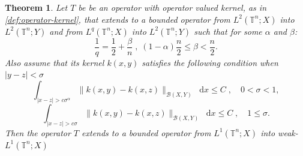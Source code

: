 \documentclass[12pt, reqno]{amsart}
\newtheorem{theorem}{Theorem}[section]
\theoremstyle{definition}
\theoremstyle{remark}
\numberwithin{equation}{section}
\newcommand*\diff{\mathop{}\!\mathrm{d}}
\begin{document}
\begin{theorem}
    Let $T$ be be an operator with operator valued kernel, as in \cref{def:operator-kernel},  that extends to a bounded operator from $L^2(\mathbb{T}^n; X)$ into $L^2(\mathbb{T}^n; Y)$ and from $L^q(\mathbb{T}^n; X)$ into $L^2(\mathbb{T}^n; Y)$ such that for some $\alpha$ and $\beta$:
    \begin{equation}
        \frac{1}{q} = \frac{1}{2} + \frac{\beta}{n} \; , \; (1-\alpha)\frac{n}{2} \leq \beta < \frac{n}{2}.
        \label{eq:alpha_condition}
    \end{equation}
    Also assume that its kernel $k(x, y)$ satisfies the following condition when $|y-z|<\sigma$
    \begin{equation}
        \int_{|x-z|>c\sigma^\alpha}\|k(x, y)-k(x,z)\|_{\mathcal{B}(X, Y)}\diff x\leq C \;, \quad 0<\sigma < 1,
        \label{eq:hyp-sigma<1}
    \end{equation}
    \begin{equation}
        \int_{|x-z|>c\sigma}\|k(x, y)-k(x,z)\|_{\mathcal{B}(X, Y)}\diff x \leq C \;, \quad 1 \leq \sigma.
        \label{eq:hyp-sgima>1}
    \end{equation}
    Then the operator $T$ extends to a bounded operator from $L^1(\mathbb{T}^n; X)$ into weak-$L^{1}(\mathbb{T}^n; X)$
    \label{theo:L1-weak}
\end{theorem}
\end{document}
